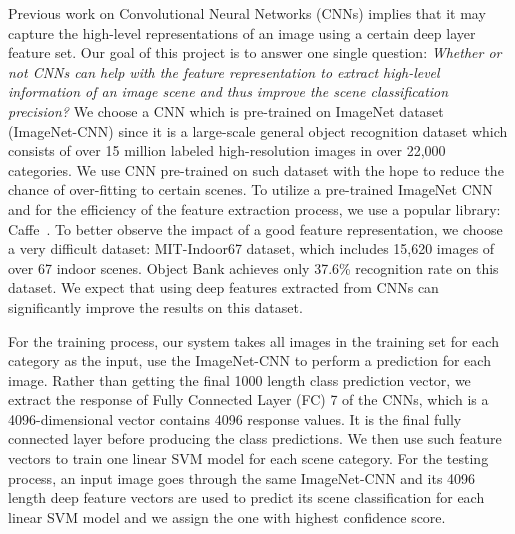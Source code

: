 
Previous work on Convolutional Neural Networks (CNNs) implies that it may
capture the high-level representations of an image using a certain deep layer
feature set. Our goal of this project is to answer one single question:
\emph{Whether or not CNNs can help with the feature representation to extract
high-level information of an image scene and thus improve the scene
classification precision?} We choose a CNN which is pre-trained on ImageNet
dataset (ImageNet-CNN) since it is a large-scale general object recognition
dataset which consists of over 15 million labeled high-resolution images in
over 22,000 categories. We use CNN pre-trained on such dataset with the hope to
reduce the chance of over-fitting to certain scenes. To utilize a pre-trained
ImageNet CNN and for the efficiency of the feature extraction process, we use
a popular library: Caffe~\cite{Jia:2014:CCA}. To better observe the impact of a good
feature representation, we choose a very difficult dataset: MIT-Indoor67 dataset,
which includes 15,620 images of over 67 indoor scenes. Object Bank achieves
only 37.6\% recognition rate on this dataset. We expect that using deep features
extracted from CNNs can significantly improve the results on this dataset.

For the training process, our system takes all images in the training set for
each category as the input, use the ImageNet-CNN to perform a prediction for
each image. Rather than getting the final 1000 length class prediction vector,
we extract the response of Fully Connected Layer (FC) 7 of the CNNs, which is
a 4096-dimensional vector contains 4096 response values. It is the final fully
connected layer before producing the class predictions. We then use such feature
vectors to train one linear SVM model for each scene category. For
the testing process, an input image goes through the same ImageNet-CNN and its
4096 length deep feature vectors are used to predict its scene classification
for each linear SVM model and we assign the one with highest confidence score.

